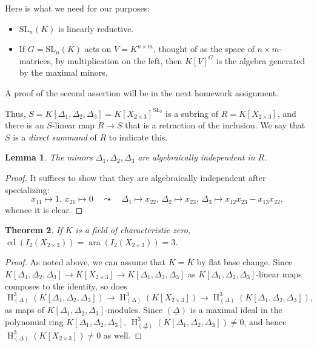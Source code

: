 \documentclass[11pt]{book}
\newtheorem{theorem}{Theorem}[chapter]
\newtheorem{lemma}[theorem]{Lemma}
\numberwithin{equation}{section}
\numberwithin{theorem}{chapter}
\theoremstyle{definition}
\newtheorem*{basic properties}{Basic Properties}
\newtheorem*{Important Remark}{Important Remark}
\theoremstyle{remark}
\newcommand{\ara}{\operatorname{ara}}
\DeclareMathOperator{\cd}{cd}
\renewcommand{\H}{\operatorname{H}}
\begin{document}
Here is what we need for our purposes:

\begin{itemize}
	\item $\mathrm{SL}_n(K)$ is linearly reductive.
	\item If $G=\mathrm{SL}_n(K)$ acts on $V=K^{n \times m}$, thought of as the space of $n\times m$-matrices, by multiplication on the left, then $K[V]^G$ is the algebra generated by the maximal minors.
\end{itemize}

A proof of the second assertion will be in the next homework assignment.

Thus, $S=K[\Delta_1,\Delta_2,\Delta_3]=K[X_{2\times 3}]^{\mathrm{SL}_2}$ is a subring of $R=K[X_{2\times 3}]$, and there is an $S$-linear map $R\to S$ that is a retraction of the inclusion. We say that $S$ is a \emph{direct summand} of $R$ to indicate this.

\begin{lemma}
	The minors $\Delta_1,\Delta_2,\Delta_3$ are algebraically independent in $R$.
\end{lemma} 
\begin{proof}
	It suffices to show that they are algebraically independent after specializing: 
	\[x_{11}\mapsto 1,\, x_{21}\mapsto 0  \quad \leadsto \quad \Delta_1\mapsto x_{22},\, \Delta_2 \mapsto x_{23},\, \Delta_3 \mapsto x_{12}x_{23}-x_{13}x_{22},\]
	whence it is clear.
\end{proof}

\begin{theorem}
	If $K$ is a field of characteristic zero, $\cd(I_2(X_{2\times 3}))=\ara(I_2(X_{2\times 3}))=3$.
\end{theorem}
\begin{proof}
	As noted above, we can assume that $K=\overline{K}$ by flat base change. Since $K[\Delta_1,\Delta_2,\Delta_3] \to K[X_{2\times 3}] \to  K[\Delta_1,\Delta_2,\Delta_3]$ as $K[\Delta_1,\Delta_2,\Delta_3]$-linear maps composes to the identity, so does 
	\[ \H^3_{(\underline{\Delta})}(K[\Delta_1,\Delta_2,\Delta_3]) \to \H^3_{(\underline{\Delta})}(K[X_{2\times 3}]) \to \H^3_{(\underline{\Delta})}(K[\Delta_1,\Delta_2,\Delta_3]),  \]
	as maps of $K[\Delta_1,\Delta_2,\Delta_3]$-modules. Since $(\underline{\Delta})$ is a maximal ideal in the polynomial ring $K[\Delta_1,\Delta_2,\Delta_3]$, $\H^3_{(\underline{\Delta})}(K[\Delta_1,\Delta_2,\Delta_3])\neq 0$, and hence $\H^3_{(\underline{\Delta})}(K[X_{2\times 3}])\neq 0$ as well.
\end{proof}
\end{document}
